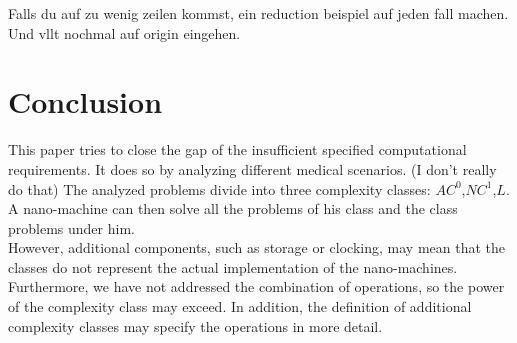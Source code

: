 \documentclass[10pt,sigconf]{acmart}
\begin{document}
Falls du auf zu wenig zeilen kommst, ein reduction beispiel auf jeden fall machen. Und vllt nochmal auf origin eingehen.



\section{Conclusion}
This paper tries to close the gap of the insufficient specified computational requirements.
It does so by analyzing different medical scenarios. (I don't really do that)
The analyzed problems divide into three complexity classes: $AC^0$,$NC^1$,$L$.
A nano-machine can then solve all the problems of his class and the class problems under him.\\
However, additional components, such as storage or clocking, may mean that the classes do not represent the actual implementation of the nano-machines.
Furthermore, we have not addressed the combination of operations, so the power of the complexity class may exceed.
In addition, the definition of additional complexity classes may specify the operations in more detail.








 
\end{document}

